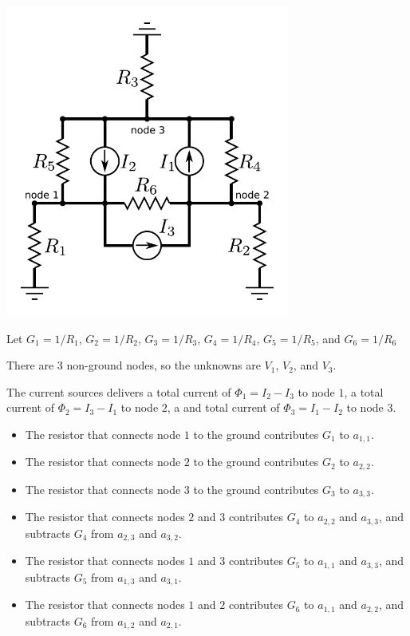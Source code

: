 \documentclass{article}
\begin{document}
\parbox{0.7\textwidth}{
\includegraphics[width = 0.7\textwidth]{complex_circuit_4}
} 

Let \(G_1 = 1/R_1\), \(G_2 = 1/R_2\), \(G_3 = 1/R_3\), \(G_4 = 1/R_4\), \(G_5 = 1/R_5\), and \(G_6 = 1/R_6\)    

There are \(3\) non-ground nodes, so the unknowns are \(V_1\), \(V_2\), and \(V_3\). 

The current sources delivers a total current of \(\Phi_1 = I_2 - I_3\) to node \(1\), a total current of \(\Phi_2 = I_3 - I_1\) to node \(2\), a and total current of \(\Phi_3 = I_1 - I_2\) to node \(3\).

\begin{itemize}
\item The resistor that connects node \(1\) to the ground contributes \(G_1\) to \(a_{1,1}\). 
\item The resistor that connects node \(2\) to the ground contributes \(G_2\) to \(a_{2,2}\). 
\item The resistor that connects node \(3\) to the ground contributes \(G_3\) to \(a_{3,3}\). 
\item The resistor that connects nodes \(2\) and \(3\) contributes \(G_4\) to \(a_{2,2}\) and \(a_{3,3}\), and subtracts \(G_4\) from \(a_{2,3}\) and \(a_{3,2}\). 
\item The resistor that connects nodes \(1\) and \(3\) contributes \(G_5\) to \(a_{1,1}\) and \(a_{3,3}\), and subtracts \(G_5\) from \(a_{1,3}\) and \(a_{3,1}\). 
\item The resistor that connects nodes \(1\) and \(2\) contributes \(G_6\) to \(a_{1,1}\) and \(a_{2,2}\), and subtracts \(G_6\) from \(a_{1,2}\) and \(a_{2,1}\). 
\end{itemize}
\end{document}

